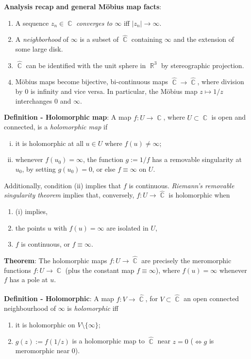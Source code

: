 \documentclass{article}
\DeclareMathOperator{\R}{\mathbb{R}}
\DeclareMathOperator{\C}{\mathbb{C}}
\begin{document}
\textbf{Analysis recap and general Möbius map facts}: \begin{enumerate}
    \item A sequence $z_n \in \C$ \textit{converges to $\infty$} iff $|z_n| \rightarrow \infty$.
    \item A \textit{neighborhood} of $\infty$ is a subset of $\hat{\C}$ containing $\infty$ and the extension of some large disk.
    \item $\hat{\C}$ can be identified with the unit sphere in $\R^3$ by stereographic projection.
    \item Möbius maps become bijective, bi-continuous maps $\hat{\C} \rightarrow \hat{\C}$, where division by 0 is infinity and vice versa. In particular, the Möbius map $z \mapsto 1/z$ interchanges 0 and $\infty$.
\end{enumerate} $ $ \\
\textbf{Definition - Holomorphic map}: A map $f: U \rightarrow \hat{\C}$, where $U \subset \C$ is open and connected, is a \textit{holomorphic map} if \begin{enumerate}[(i).]
    \item it is holomorphic at all $u \in U$ where $f(u) \neq \infty$;
    \item whenever $f(u_0) = \infty$, the function $g := 1/f$ has a removable singularity at $u_0$, by setting $g(u_0) = 0$, or else $f \equiv \infty$ on $U$.
\end{enumerate} Additionally, condition (ii) implies that $f$ is  continuous. \textit{Riemann's removable singularity theorem} implies that, conversely, $f: U \rightarrow \hat{\C}$ is holomorphic when \begin{enumerate}
    \item (i) implies,
    \item the points $u$ with $f(u) = \infty$ are isolated in $U$,
    \item $f$ is continuous, or $f \equiv \infty$.
\end{enumerate} $ $ \\
\textbf{Theorem}: The holomorphic maps $f: U \rightarrow \hat{\C}$ are precisely the meromorphic functions $f: U \rightarrow \C$ (plus the constant map $f \equiv \infty$), where $f(u) = \infty$ whenever $f$ has a pole at $u$. \\ \\
\textbf{Definition - Holomorphic}: A map $f: V \rightarrow \hat{\C}$, for $V \subset \hat{\C}$ an open connected neighbourhood of $\infty$ is \textit{holomorphic} iff \begin{enumerate}
    \item it is holomorphic on $V \setminus \{\infty\}$;
    \item $g(z) := f(1/z)$ is a holomorphic map to $\hat{\C}$ near $z = 0$ ($\iff g$ is meromorphic near 0). 
\end{enumerate} $ $ \\
\end{document}
